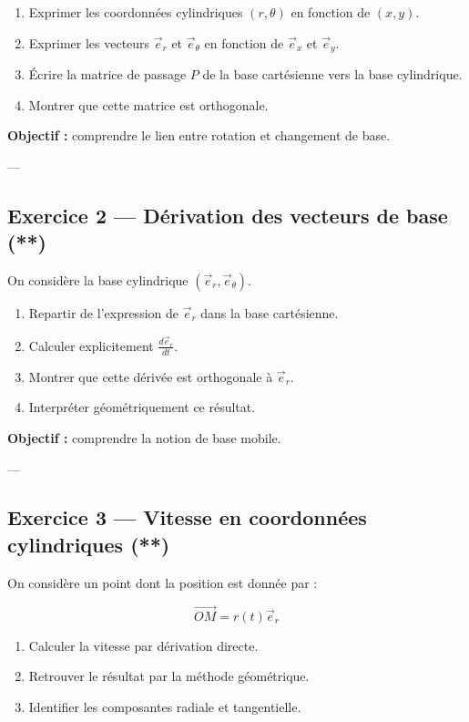 \documentclass[11pt,a4paper]{article}
\begin{document}
\begin{enumerate}
\item Exprimer les coordonnées cylindriques $(r,\theta)$ en fonction de $(x,y)$.
\item Exprimer les vecteurs $\vec{e}_r$ et $\vec{e}_\theta$ en fonction de $\vec{e}_x$ et $\vec{e}_y$.
\item Écrire la matrice de passage $P$ de la base cartésienne vers la base cylindrique.
\item Montrer que cette matrice est orthogonale.
\end{enumerate}

\textbf{Objectif :} comprendre le lien entre rotation et changement de base.

---

\subsection*{Exercice 2 — Dérivation des vecteurs de base (**)}

On considère la base cylindrique $(\vec{e}_r,\vec{e}_\theta)$.

\begin{enumerate}
\item Repartir de l’expression de $\vec{e}_r$ dans la base cartésienne.
\item Calculer explicitement $\frac{d\vec{e}_r}{dt}$.
\item Montrer que cette dérivée est orthogonale à $\vec{e}_r$.
\item Interpréter géométriquement ce résultat.
\end{enumerate}

\textbf{Objectif :} comprendre la notion de base mobile.

---

\subsection*{Exercice 3 — Vitesse en coordonnées cylindriques (**)}

On considère un point dont la position est donnée par :

\[
\vec{OM} = r(t)\vec{e}_r
\]

\begin{enumerate}
\item Calculer la vitesse par dérivation directe.
\item Retrouver le résultat par la méthode géométrique.
\item Identifier les composantes radiale et tangentielle.
\end{enumerate}
\end{document}

